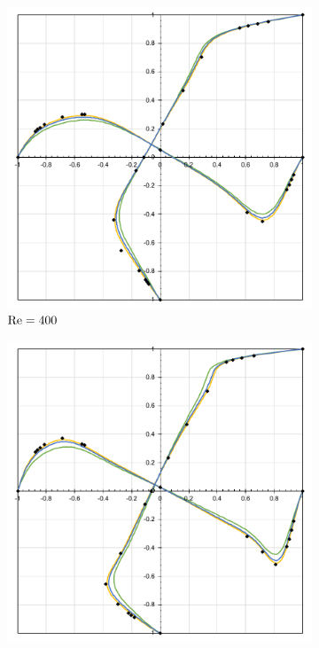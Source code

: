 \begin{figure}[h]
\begin{subfigure}{0.4\textwidth}
    \includegraphics[width=\linewidth]{Figuras/Cavity/Re400.pdf}
    \caption{$\mathrm{Re}=400$}
    \end{subfigure}
    \begin{subfigure}{0.4\textwidth}
    \includegraphics[width=\linewidth]{Figuras/Cavity/Re1000.pdf}

\end{subfigure}
\end{figure}

